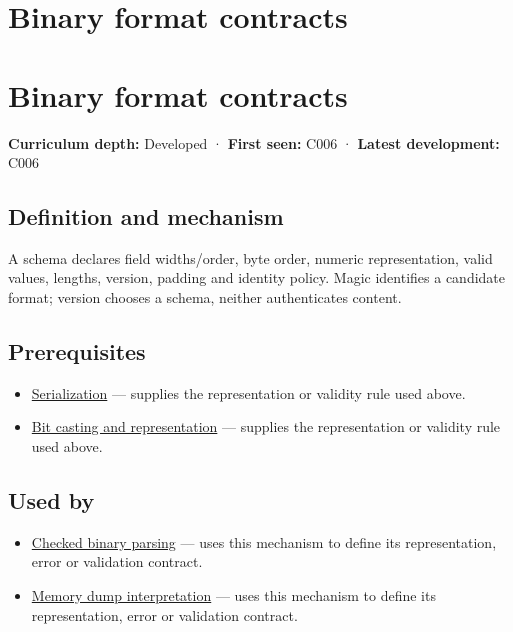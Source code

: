\hypertarget{appendix-590bbb2424c1}{}
\section*{Binary format contracts}
\section{Binary format contracts}\label{appendix-590bbb2424c1-binary-format-contracts}

\textbf{Curriculum depth:} Developed · \textbf{First seen:} C006 · \textbf{Latest development:} C006

\subsection{Definition and mechanism}\label{appendix-590bbb2424c1-definition-and-mechanism}

A schema declares field widths/order, byte order, numeric representation, valid values, lengths, version, padding and identity policy. Magic identifies a candidate format; version chooses a schema, neither authenticates content.

\subsection{Prerequisites}\label{appendix-590bbb2424c1-prerequisites}

\begin{itemize}
\tightlist
\item
  \hyperref[appendix-91d09ebed979]{Serialization} --- supplies the representation or validity rule used above.
\item
  \hyperref[appendix-34ee45f161c1]{Bit casting and representation} --- supplies the representation or validity rule used above.
\end{itemize}

\subsection{Used by}\label{appendix-590bbb2424c1-used-by}

\begin{itemize}
\tightlist
\item
  \hyperref[appendix-652d81568de9]{Checked binary parsing} --- uses this mechanism to define its representation, error or validation contract.
\item
  \hyperref[appendix-230b59c0676b]{Memory dump interpretation} --- uses this mechanism to define its representation, error or validation contract.
\end{itemize}

